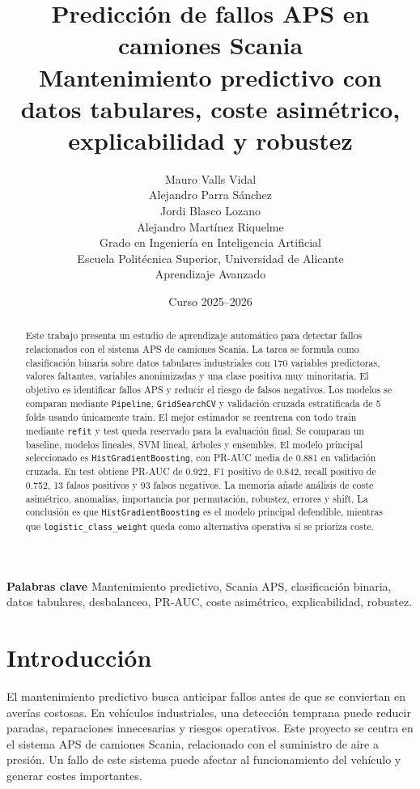 \documentclass[11pt,a4paper]{article}
\title{\textbf{Predicción de fallos APS en camiones Scania}\\
\large Mantenimiento predictivo con datos tabulares, coste asimétrico, explicabilidad y robustez}
\author{
    Mauro Valls Vidal\\
    Alejandro Parra Sánchez\\
    Jordi Blasco Lozano\\
    Alejandro Martínez Riquelme\\[0.4em]
    \small Grado en Ingeniería en Inteligencia Artificial\\
    \small Escuela Politécnica Superior, Universidad de Alicante\\
    \small Aprendizaje Avanzado
}
\date{Curso 2025--2026}
\begin{document}
\maketitle

\begin{abstract}
Este trabajo presenta un estudio de aprendizaje automático para detectar fallos relacionados con el sistema APS de camiones Scania. La tarea se formula como clasificación binaria sobre datos tabulares industriales con 170 variables predictoras, valores faltantes, variables anonimizadas y una clase positiva muy minoritaria. El objetivo es identificar fallos APS y reducir el riesgo de falsos negativos. Los modelos se comparan mediante \texttt{Pipeline}, \texttt{GridSearchCV} y validación cruzada estratificada de 5 folds usando únicamente train. El mejor estimador se reentrena con todo train mediante \texttt{refit} y test queda reservado para la evaluación final. Se comparan un baseline, modelos lineales, SVM lineal, árboles y ensembles. El modelo principal seleccionado es \texttt{HistGradientBoosting}, con PR-AUC media de 0.881 en validación cruzada. En test obtiene PR-AUC de 0.922, F1 positivo de 0.842, recall positivo de 0.752, 13 falsos positivos y 93 falsos negativos. La memoria añade análisis de coste asimétrico, anomalías, importancia por permutación, robustez, errores y shift. La conclusión es que \texttt{HistGradientBoosting} es el modelo principal defendible, mientras que \texttt{logistic\_class\_weight} queda como alternativa operativa si se prioriza coste.
\end{abstract}

\noindent\textbf{Palabras clave}
Mantenimiento predictivo, Scania APS, clasificación binaria, datos tabulares, desbalanceo, PR-AUC, coste asimétrico, explicabilidad, robustez.

\tableofcontents
\newpage

\section{Introducción}
\label{sec_intro}

El mantenimiento predictivo busca anticipar fallos antes de que se conviertan en averías costosas. En vehículos industriales, una detección temprana puede reducir paradas, reparaciones innecesarias y riesgos operativos. Este proyecto se centra en el sistema APS de camiones Scania, relacionado con el suministro de aire a presión. Un fallo de este sistema puede afectar al funcionamiento del vehículo y generar costes importantes.
\end{document}

